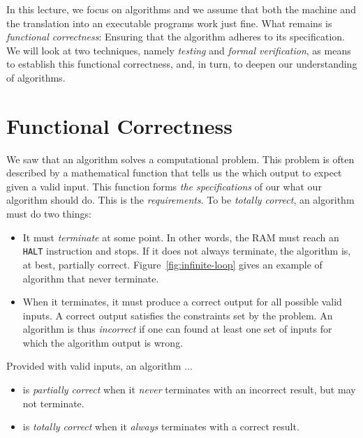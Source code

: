 \documentclass{aldast}
\begin{document}
In this lecture, we focus on algorithms and we assume that both the
machine and the translation into an executable programs work just
fine. What remains is \emph{functional correctness}: Ensuring that the
algorithm adheres to its specification. We will look at two
techniques, namely \emph{testing} and \emph{formal verification}, as
means to establish this functional correctness, and, in turn, to
deepen our understanding of algorithms.

\section{Functional Correctness}

We saw that an algorithm solves a computational problem. This problem
is often described by a mathematical function that tells us the which
output to expect given a valid input. This function forms \emph{the
  specifications} of our what our algorithm should do. This is the
\emph{requirements}. To be \emph{totally correct}, an algorithm must
do two things:

\begin{itemize}
\item It must \emph{terminate} at some point. In other words, the RAM
  must reach an \texttt{HALT} instruction and stops. If it does not
  always terminate, the algorithm is, at best, partially
  correct. Figure~\ref{fig:infinite-loop} gives an example of
  algorithm that never terminate.
\item When it terminates, it must produce a correct output for all
  possible valid inputs. A correct output satisfies the constraints
  set by the problem. An algorithm is thus \emph{incorrect} if one can
  found at least one set of inputs for which the algorithm output is
  wrong.
\end{itemize}

\begin{takeaway}
  Provided with valid inputs, an algorithm ...
  \begin{itemize}
  \item is \emph{partially correct} when it \emph{never} terminates
    with an incorrect result, but may not terminate.
  \item is \emph{totally correct} when it \emph{always} terminates with a correct result.
  \end{itemize}
\end{takeaway}
\end{document}
